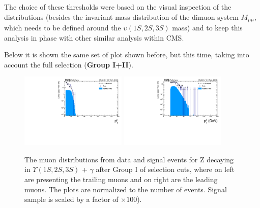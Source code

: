 The choice of these thresholds were based on the visual inspection of the distributions (besides the invariant mass distribution of the dimuon system $M_{\mu\mu}$, which needs to be defined around the $\upsilon(1S, 2S, 3S)$ mass) and to keep this analysis in phase with other similar analysis within CMS.


Below it is shown the same set of plot shown before, but this time, taking into account the full selection (\textbf{Group I+II}).


\begin{figure}[!htbp]
\begin{center}
\includegraphics[width=0.45\textwidth]{figures/outputPlots/ZtoUpsilon_Cat0_ZZZZZ/nEvts/data_x_mc/withKinCuts/h_withKin_TrailingMu_pt}\hspace*{1.cm}
\includegraphics[width=0.45\textwidth]{figures/outputPlots/ZtoUpsilon_Cat0_ZZZZZ/nEvts/data_x_mc/withKinCuts/h_withKin_LeadingMu_pt}
\end{center}\vspace*{-.5cm}
\caption{The \PT muon distributions from data and signal events for Z decaying in $\Upsilon(1S,2S,3S)$ + $\gamma$ after Group I of selection cuts, where on left are presenting the trailing muons and on right are the leading muons. The plots are normalized to the number of events. Signal sample is scaled by a factor of $\times 100$).}
\label{fig:pTMuons_ZtoUpsilon_Cat0_groupI_plus_II}
\end{figure}


